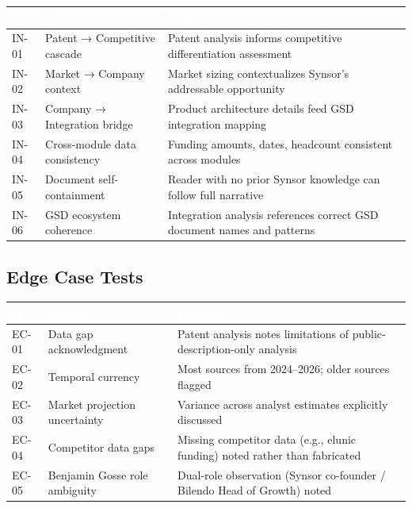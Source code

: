 \documentclass[11pt,letterpaper]{article}
\newcommand{\tableheader}[1]{\textbf{\sffamily\textcolor{white}{#1}}}
\begin{document}
\begin{center}
\begin{tabularx}{\textwidth}{C{1.2cm}L{4cm}X}
\toprule
{}
\tableheader{ID} & \tableheader{Verifies} & \tableheader{Expected} \\
\midrule
IN-01 & Patent → Competitive cascade & Patent analysis informs competitive differentiation assessment \\
IN-02 & Market → Company context & Market sizing contextualizes Synsor's addressable opportunity \\
IN-03 & Company → Integration bridge & Product architecture details feed GSD integration mapping \\
IN-04 & Cross-module data consistency & Funding amounts, dates, headcount consistent across modules \\
IN-05 & Document self-containment & Reader with no prior Synsor knowledge can follow full narrative \\
IN-06 & GSD ecosystem coherence & Integration analysis references correct GSD document names and patterns \\
\bottomrule
\end{tabularx}
\end{center}

\subsection{Edge Case Tests}

\begin{center}
\begin{tabularx}{\textwidth}{C{1.2cm}L{4cm}X}
\toprule
{}
\tableheader{ID} & \tableheader{Verifies} & \tableheader{Expected} \\
\midrule
EC-01 & Data gap acknowledgment & Patent analysis notes limitations of public-description-only analysis \\
EC-02 & Temporal currency & Most sources from 2024--2026; older sources flagged \\
EC-03 & Market projection uncertainty & Variance across analyst estimates explicitly discussed \\
EC-04 & Competitor data gaps & Missing competitor data (e.g., elunic funding) noted rather than fabricated \\
EC-05 & Benjamin Gosse role ambiguity & Dual-role observation (Synsor co-founder / Bilendo Head of Growth) noted \\
\bottomrule
\end{tabularx}
\end{center}
\end{document}

